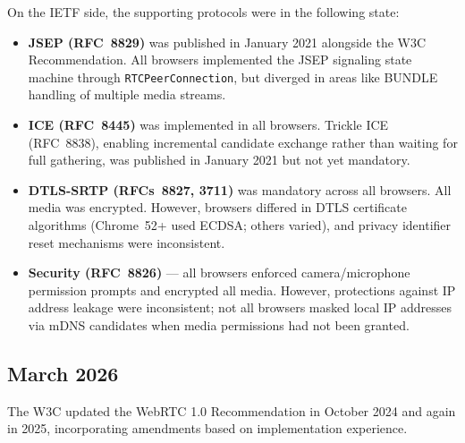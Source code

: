 \documentclass[11pt]{article}
\begin{document}
On the IETF side, the supporting protocols were in the following state:
\begin{itemize}
  \item \textbf{JSEP (RFC~8829)} was published in January 2021 alongside the
    W3C Recommendation. All browsers implemented the JSEP signaling
    state machine through \texttt{RTCPeerConnection}, but diverged in areas
    like BUNDLE handling of multiple media streams.
  \item \textbf{ICE (RFC~8445)} was implemented in all browsers. Trickle ICE
    (RFC~8838), enabling incremental candidate exchange rather than waiting for
    full gathering, was published in January 2021 but not yet mandatory.
  \item \textbf{DTLS-SRTP (RFCs~8827, 3711)} was mandatory across all
    browsers. All media was encrypted. However, browsers differed in DTLS
    certificate algorithms (Chrome~52+ used ECDSA; others varied), and
    privacy identifier reset mechanisms were inconsistent.
  \item \textbf{Security (RFC~8826)} --- all browsers enforced
    camera/microphone permission prompts and encrypted all media. However,
    protections against IP address leakage were inconsistent; not all browsers
    masked local IP addresses via mDNS candidates when media permissions had
    not been granted.
\end{itemize}

\subsection{March 2026}

The W3C updated the WebRTC 1.0 Recommendation in October 2024 and again in
2025, incorporating amendments based on implementation experience.
\end{document}
